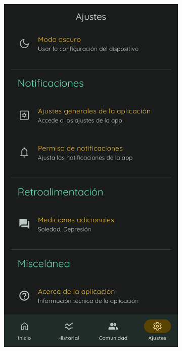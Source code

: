 \begin{figure}[htbp]
\begin{subfigure}[c]{0.29\textwidth}
                	\end{subfigure}
                	\hspace{0.05\textwidth}
                	\begin{subfigure}[c]{0.29\textwidth}
                		\centering
                		\includegraphics[width=1\linewidth]{figures/pantallas/Ajustes 2.png}

\end{subfigure}
\end{figure}
